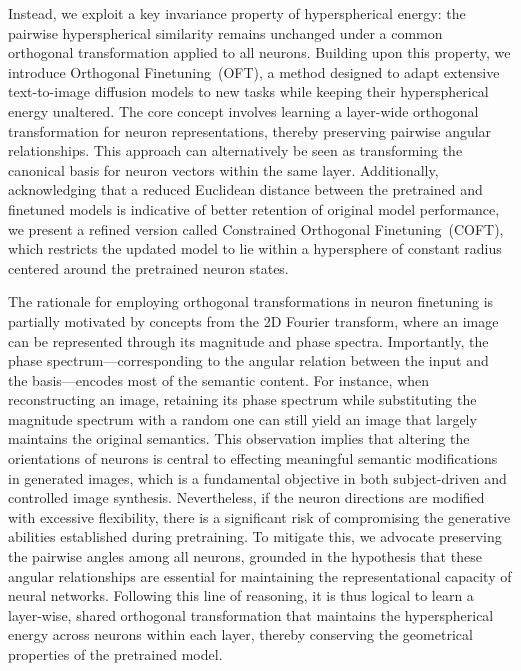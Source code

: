 Instead, we exploit a key invariance property of hyperspherical energy: the pairwise hyperspherical similarity remains unchanged under a common orthogonal transformation applied to all neurons. Building upon this property, we introduce Orthogonal Finetuning~(OFT), a method designed to adapt extensive text-to-image diffusion models to new tasks while keeping their hyperspherical energy unaltered. The core concept involves learning a layer-wide orthogonal transformation for neuron representations, thereby preserving pairwise angular relationships. This approach can alternatively be seen as transforming the canonical basis for neuron vectors within the same layer. Additionally, acknowledging that a reduced Euclidean distance between the pretrained and finetuned models is indicative of better retention of original model performance, we present a refined version called Constrained Orthogonal Finetuning~(COFT), which restricts the updated model to lie within a hypersphere of constant radius centered around the pretrained neuron states.

The rationale for employing orthogonal transformations in neuron finetuning is partially motivated by concepts from the 2D Fourier transform, where an image can be represented through its magnitude and phase spectra. Importantly, the phase spectrum—corresponding to the angular relation between the input and the basis—encodes most of the semantic content. For instance, when reconstructing an image, retaining its phase spectrum while substituting the magnitude spectrum with a random one can still yield an image that largely maintains the original semantics. This observation implies that altering the orientations of neurons is central to effecting meaningful semantic modifications in generated images, which is a fundamental objective in both subject-driven and controlled image synthesis. Nevertheless, if the neuron directions are modified with excessive flexibility, there is a significant risk of compromising the generative abilities established during pretraining. To mitigate this, we advocate preserving the pairwise angles among all neurons, grounded in the hypothesis that these angular relationships are essential for maintaining the representational capacity of neural networks. Following this line of reasoning, it is thus logical to learn a layer-wise, shared orthogonal transformation that maintains the hyperspherical energy across neurons within each layer, thereby conserving the geometrical properties of the pretrained model.

